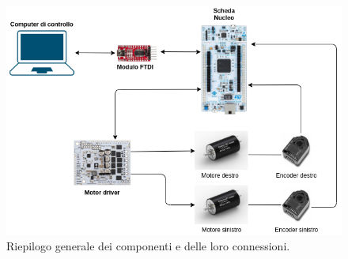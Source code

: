 \begin{figure}[H]
\centering
\includegraphics[scale=0.65]{images/Infrastruttura.png}
\caption{Riepilogo generale dei componenti e delle loro connessioni.}
\end{figure}
